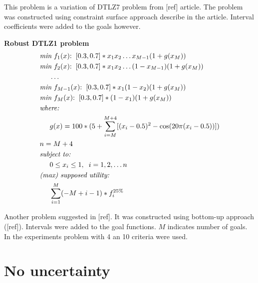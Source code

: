 \begin{description}
    This problem is a variation of DTLZ7 problem from [ref] article. The
    problem was constructed using constraint surface approach describe in the
    article. Interval coefficients were added to the goals however.


  \item{\textbf{Robust DTLZ1 problem}}
    \begin{align*}
      & \textit{min}\text{ $f_1(x)$:} \hspace{0.2cm}
      [0.3, 0.7] * x_1 x_2 \dots x_{M-1}(1 + g(x_M)) \\
      & \textit{min}\text{ $f_2(x)$:} \hspace{0.2cm}
      [0.3, 0.7] * x_1 x_2 \dots (1 - x_{M-1})(1 + g(x_M)) \\
      & \hspace{0.5cm} \dots \\
      & \textit{min}\text{ $f_{M-1}(x)$:} \hspace{0.2cm}
      [0.3, 0.7] * x_1 (1 - x_2) (1 + g(x_M)) \\
      & \textit{min}\text{ $f_M(x)$:} \hspace{0.2cm}
      [0.3, 0.7] * (1 - x_1) (1 + g(x_M)) \\
      & \textit{where:} \\ 
      & \hspace{0.5cm} g(x) = 100 * (5 + \sum_{i=M}^{M+4}
        [ (x_i - 0.5)^2 - \text{cos}(20 \pi (x_i -0.5)) ])\\
      & n = M + 4 \\
      & \textit{subject to:} \\  
      & \hspace{0.5cm} 0 \le x_i \le 1, \hspace{0.2cm} i = 1, 2, \dots n \\
      & \textit{(max) supposed utility:} \\
      & \hspace{0.5cm} \sum_{i=1}^M (-M+i-1) * f_i^{25\%} 
    \end{align*}

  Another problem suggested in [ref]. It was constructed using bottom-up
  approach ([ref]). Intervals were added to the goal functions. $M$ indicates
  number of goals. In the experiments problem with 4 an 10 criteria were used.

\end{description}

\section{No uncertainty}

